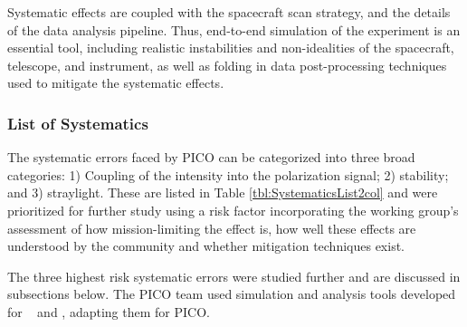 \documentclass[PICOReport.tex]{subfiles}
\begin{document}
Systematic effects are coupled with the spacecraft scan strategy, and the details of the data analysis pipeline. Thus, end-to-end simulation of the experiment is an essential tool, including realistic instabilities and non-idealities of the spacecraft, telescope, and instrument, as well as folding in data post-processing techniques used to mitigate the systematic effects.    

\subsubsection{List of Systematics}
\label{sec:systematics_list}

The systematic errors faced by PICO can be categorized into three broad categories: 
1) Coupling of the intensity into the polarization signal; 2) stability; and 3) straylight. These are listed in Table \ref{tbl:SystematicsList2col} and were prioritized for further study using a risk factor incorporating the working group's assessment of how mission-limiting the effect is, how well these effects are understood by the community and whether mitigation techniques exist.  

The three highest risk systematic errors were studied further and are discussed in subsections below.  The PICO team used 
 simulation and analysis tools developed for \planck~\cite{plank2015_xii_focalplane} and \core, adapting them for PICO.

\end{document}
